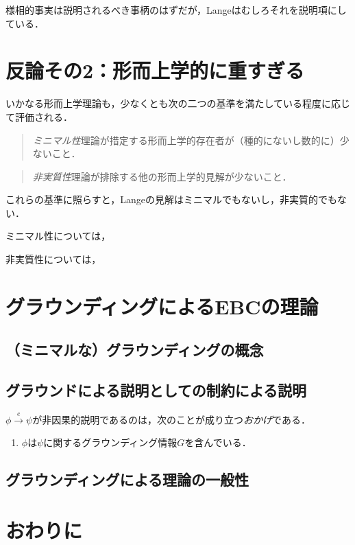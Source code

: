 \documentclass[twoside,11pt,uplatex]{jsarticle}
\theoremstyle{definition}
\begin{document}
様相的事実は説明されるべき事柄のはずだが，Langeはむしろそれを説明項にしている．

\section{反論その2：形而上学的に重すぎる}\label{secondargument}

いかなる形而上学理論も，少なくとも次の二つの基準を満たしている程度に応じて評価される．
\begin{quote}
    \emph{ミニマル性}\quad 理論が措定する形而上学的存在者が（種的にないし数的に）少ないこと．
\end{quote}

\begin{quote}
    \emph{非実質性}\quad 理論が排除する他の形而上学的見解が少ないこと．
\end{quote}
これらの基準に照らすと，Langeの見解はミニマルでもないし，非実質的でもない．

ミニマル性については，

非実質性については，

\section{グラウンディングによるEBCの理論}

\subsection{（ミニマルな）グラウンディングの概念}

\subsection{グラウンドによる説明としての制約による説明}
$\phi\xrightarrow{e}\psi$が非因果的説明であるのは，次のことが成り立つ\emph{おかげ}である．
	\begin{enumerate}
	\item $\phi$は$\psi$に関するグラウンディング情報$G$を含んでいる．
	\end{enumerate}

\subsection{グラウンディングによる理論の一般性}


\section{おわりに}
\end{document}
